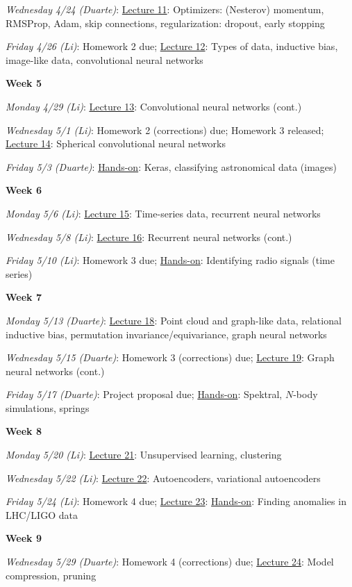 \documentclass[12pt]{article}
\begin{document}
\emph{Wednesday 4/24 (Duarte)}: \underline{Lecture 11}: Optimizers: (Nesterov) momentum, RMSProp, Adam, skip connections, regularization: dropout, early stopping

\emph{Friday 4/26 (Li)}: Homework 2 due; \underline{Lecture 12}: Types of data, inductive bias, image-like data, convolutional neural networks

\noindent\textbf{Week 5}

\emph{Monday 4/29 (Li)}: \underline{Lecture 13}: Convolutional neural networks (cont.)

\emph{Wednesday 5/1 (Li)}: Homework 2 (corrections) due; Homework 3 released; \underline{Lecture 14}: Spherical convolutional neural networks

\emph{Friday 5/3 (Duarte)}: \underline{Hands-on}: Keras, classifying astronomical data (images)

\noindent\textbf{Week 6}

\emph{Monday 5/6 (Li)}: \underline{Lecture 15}: Time-series data, recurrent neural networks

\emph{Wednesday 5/8 (Li)}: \underline{Lecture 16}: Recurrent neural networks (cont.)

\emph{Friday 5/10 (Li)}: Homework 3 due; \underline{Hands-on}: Identifying radio signals (time series)

\noindent\textbf{Week 7}

\emph{Monday 5/13 (Duarte)}: \underline{Lecture 18}: Point cloud and graph-like data, relational inductive bias, permutation invariance/equivariance, graph neural networks

\emph{Wednesday 5/15 (Duarte)}: Homework 3 (corrections) due; \underline{Lecture 19}: Graph neural networks (cont.)

\emph{Friday 5/17 (Duarte)}: Project proposal due; \underline{Hands-on}: Spektral, $N$-body simulations, springs

\noindent\textbf{Week 8}

\emph{Monday 5/20 (Li)}: \underline{Lecture 21}: Unsupervised learning, clustering

\emph{Wednesday 5/22 (Li)}: \underline{Lecture 22}: Autoencoders, variational autoencoders

\emph{Friday 5/24 (Li)}: Homework 4 due; \underline{Lecture 23}: \underline{Hands-on}: Finding anomalies in LHC/LIGO data

\noindent\textbf{Week 9}

\emph{Wednesday 5/29 (Duarte)}: Homework 4 (corrections) due; \underline{Lecture 24}: Model compression, pruning
\end{document}
